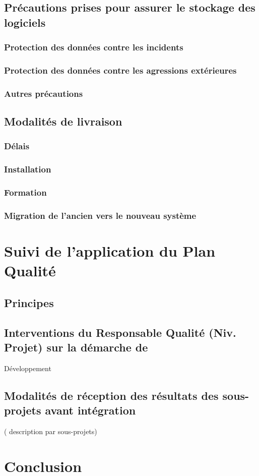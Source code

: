 \documentclass[a4paper]{article}
\begin{document}
\subsection{Précautions prises pour assurer le stockage des logiciels}
\subsubsection{Protection des données contre les incidents}
\subsubsection{Protection des données contre les agressions extérieures}
\subsubsection{Autres précautions}
\subsection{Modalités de livraison}
\subsubsection{Délais}
\subsubsection{Installation}
\subsubsection{Formation}
\subsubsection{Migration de l'ancien vers le nouveau système}

\section{Suivi de l'application du Plan Qualité}
\subsection{Principes}
\subsection{Interventions du Responsable Qualité (Niv. Projet) sur la démarche de }
                    Développement
\subsection{Modalités de réception des résultats des sous-projets avant intégration}
        ( description par sous-projets)

\section{Conclusion}
\end{document}
